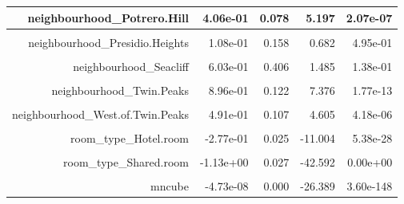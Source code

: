 \documentclass[justified, 11pt]{scrartcl}\usepackage[]{graphicx}\usepackage[]{xcolor}
\newenvironment{knitrout}{}{} %
\begin{document}
\begin{knitrout}
\begin{table}
\begin{tabular}{r|r|r|r|r}
\hline
neighbourhood\_Potrero.Hill & 4.06e-01 & 0.078 & 5.197 & 2.07e-07\\
\hline
\cellcolor{gray!6}{neighbourhood\_Presidio} & \cellcolor{gray!6}{5.77e-01} & \cellcolor{gray!6}{0.290} & \cellcolor{gray!6}{1.989} & \cellcolor{gray!6}{4.67e-02}\\
\hline
neighbourhood\_Presidio.Heights & 1.08e-01 & 0.158 & 0.682 & 4.95e-01\\
\hline
\cellcolor{gray!6}{neighbourhood\_Russian.Hill} & \cellcolor{gray!6}{3.23e-01} & \cellcolor{gray!6}{0.122} & \cellcolor{gray!6}{2.644} & \cellcolor{gray!6}{8.21e-03}\\
\hline
neighbourhood\_Seacliff & 6.03e-01 & 0.406 & 1.485 & 1.38e-01\\
\hline
\cellcolor{gray!6}{neighbourhood\_South.of.Market} & \cellcolor{gray!6}{2.07e-01} & \cellcolor{gray!6}{0.087} & \cellcolor{gray!6}{2.385} & \cellcolor{gray!6}{1.71e-02}\\
\hline
neighbourhood\_Twin.Peaks & 8.96e-01 & 0.122 & 7.376 & 1.77e-13\\
\hline
\cellcolor{gray!6}{neighbourhood\_Visitacion.Valley} & \cellcolor{gray!6}{2.08e-01} & \cellcolor{gray!6}{0.080} & \cellcolor{gray!6}{2.598} & \cellcolor{gray!6}{9.38e-03}\\
\hline
neighbourhood\_West.of.Twin.Peaks & 4.91e-01 & 0.107 & 4.605 & 4.18e-06\\
\hline
\cellcolor{gray!6}{neighbourhood\_Western.Addition} & \cellcolor{gray!6}{3.41e-01} & \cellcolor{gray!6}{0.100} & \cellcolor{gray!6}{3.401} & \cellcolor{gray!6}{6.75e-04}\\
\hline
room\_type\_Hotel.room & -2.77e-01 & 0.025 & -11.004 & 5.38e-28\\
\hline
\cellcolor{gray!6}{room\_type\_Private.room} & \cellcolor{gray!6}{-5.40e-01} & \cellcolor{gray!6}{0.020} & \cellcolor{gray!6}{-27.434} & \cellcolor{gray!6}{1.55e-159}\\
\hline
room\_type\_Shared.room & -1.13e+00 & 0.027 & -42.592 & 0.00e+00\\
\hline
\cellcolor{gray!6}{mnsqd} & \cellcolor{gray!6}{6.47e-05} & \cellcolor{gray!6}{0.000} & \cellcolor{gray!6}{29.183} & \cellcolor{gray!6}{2.18e-179}\\
\hline
mncube & -4.73e-08 & 0.000 & -26.389 & 3.60e-148\\
\hline
\end{tabular}
\endgroup{}
\end{table}

\end{knitrout}
\normalsize

{}

\end{document}
